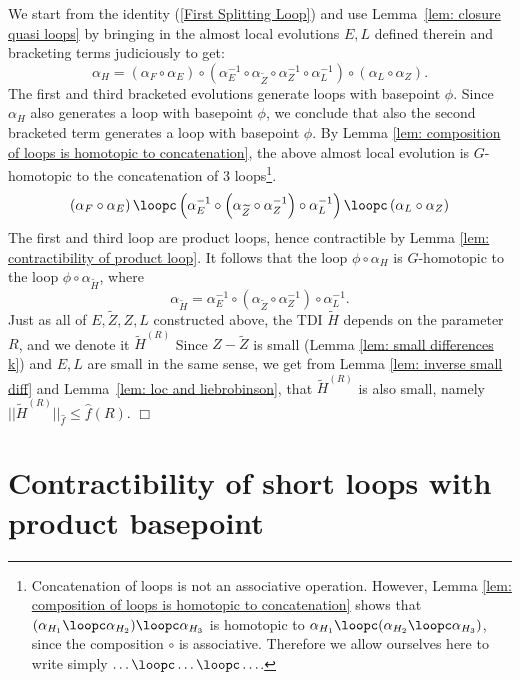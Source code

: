 We start from the identity (\ref{First Splitting Loop}) and use Lemma~\ref{lem: closure quasi loops} by bringing in the almost local evolutions $E,L$ defined therein and  bracketing terms judiciously to get:
$$
\alpha_H=   \left(\alpha_{F} \circ \alpha_E\right)   \circ  \left(\alpha^{-1}_E \circ  \alpha_{\widetilde Z} \circ \alpha^{-1}_Z \circ \alpha^{-1}_L\right) \circ \left(\alpha_L \circ \alpha_Z\right).
$$ 
The first and third bracketed evolutions generate loops with basepoint $\phi$. Since $\alpha_H$ also generates a loop with basepoint $\phi$, we conclude that also the second bracketed term generates a loop with basepoint $\phi$. By Lemma \ref{lem: composition of loops is homotopic to concatenation},  the above almost local evolution is $G$-homotopic to the concatenation of 3 loops\footnote{Concatenation of loops is not an associative operation. However, Lemma \ref{lem: composition of loops is homotopic to concatenation} shows that $(\alpha_{H_1}\loopc\alpha_{H_2})\loopc \alpha_{H_3}$ is homotopic to $\alpha_{H_1}\loopc(\alpha_{H_2}\loopc \alpha_{H_3})$, since the composition $\circ$ is associative. Therefore we allow ourselves here to write simply $\ldots\loopc\ldots\loopc\ldots$.}.
$$
\left( \alpha_{F} \circ \alpha_E \right) \loopc \left(\alpha^{-1}_E \circ  \left(\alpha_{\widetilde Z} \circ \alpha^{-1}_Z\right) \circ \alpha^{-1}_L\right) \loopc\left( \alpha_L \circ \alpha_Z \right)
$$
The first and third loop are product loops, hence contractible by Lemma \ref{lem: contractibility of product loop}. It follows that the loop $\phi\circ \alpha_H$ is $G$-homotopic to the loop $\phi\circ \alpha_{\widetilde H}$, where
$$
\alpha_{\widetilde H}=\alpha^{-1}_E \circ  \left(\alpha_{\widetilde Z} \circ \alpha^{-1}_Z\right) \circ \alpha^{-1}_L.
$$
Just as all of $E,\widetilde Z,Z,L$ constructed above, the  TDI $\widetilde H$ depends on the parameter $R$, and we denote it $\widetilde H^{(R)}$
Since $Z-\widetilde Z$ is small (Lemma \ref{lem: small differences k}) and $E,L$ are small in the same sense, we get from Lemma \ref{lem: inverse small diff} and Lemma~\ref{lem: loc and liebrobinson}, that  $\widetilde H^{(R)}$ is also small, namely
$||\widetilde H^{(R)}||_{\hat{f}}\leq \hat{f}(R)$. 
\hfill \ensuremath{\Box}

\section{Contractibility of short loops with product basepoint}\label{sec: contractibility of short loops with product basepoint}


